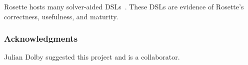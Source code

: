 \documentclass[nocopyrightspace,preprint,9pt]{sigplanconf}
\begin{document}
Rosette hosts many solver-aided DSLs~\cite{wwtekt-oopsla-2016,pjstcb-pldi-2014}.
These DSLs are evidence of Rosette's correctness, usefulness, and maturity.


\subsubsection*{Acknowledgments}
Julian Dolby suggested this project and is a collaborator.



\end{document}
